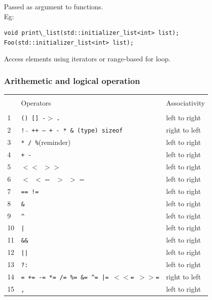 Passed as argument to functions.\\
Eg:
\begin{mdframed}[nobreak=true,backgroundcolor=gray!10,linecolor=Firebrick4]
\begin{verbatim}
void print\_list(std::initializer_list<int> list); 
Foo(std::initializer_list<int> list);
\end{verbatim}
\end{mdframed}

Access elements using iterators or range-based for loop.\\


\vfill\null
\columnbreak

\subsubsection{Arithemetic and logical operation}

    \begin{tabularx}{\linewidth}{l|lX}
        \hline\\
        & Operators & Associativity \\
        \hline \\
        1 & \texttt{() [] -$>$} \textbf{.} & left to right\\
        2 & \texttt{! $\tilde{}$ ++ -- + - * \& (type) sizeof} & right to left\\
        3 & \texttt{* / \%}(reminder) & left to right\\
        4 & \texttt{+ -} & left to right \\
        5 & \texttt{$<<$ $>>$} & left to right \\
        6 & \texttt{$<$ $<=$ $>$ $>=$}  & left to right\\
        7 & \texttt{== !=} & left to right\\
        8 & \texttt{\&} & left to right \\
        9 & \texttt{\^} & left to right \\
        10 & \texttt{|} & left to right\\
        11 & \texttt{\&\&} & left to right\\
        12 & \texttt{||} & left to right \\
        13 & \texttt{?:} & left to right \\
        14 & \texttt{= += -= *= /= \%= \&= \^{}= |= $<<$= $>>$=} & right to left\\
        15 & \texttt{,} & left to right\\
        \hline
    \end{tabularx}


